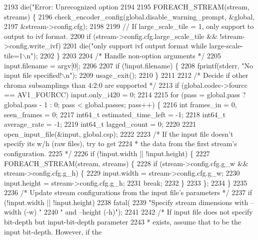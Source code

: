 \begin{DoxyCodeInclude}
{{{{{{{{{{{{{{{{{{{{{{{{{{{{{{{{{{{{{{{{{{{{{{{{{{{2193       die(\textcolor{stringliteral}{"Error: Unrecognized option %
2194 
2195   FOREACH\_STREAM(stream, streams) \{
2196     check\_encoder\_config(global.disable\_warning\_prompt, &global,
2197                          &stream->config.cfg);
2198 
2199     \textcolor{comment}{// If large\_scale\_tile = 1, only support to output to ivf format.}
2200     \textcolor{keywordflow}{if} (stream->config.cfg.large\_scale\_tile && !stream->config.write\_ivf)
2201       die(\textcolor{stringliteral}{"only support ivf output format while large-scale-tile=1\(\backslash\)n"});
2202   \}
2203 
2204   \textcolor{comment}{/* Handle non-option arguments */}
2205   input.filename = argv[0];
2206 
2207   \textcolor{keywordflow}{if} (!input.filename) \{
2208     fprintf(stderr, \textcolor{stringliteral}{"No input file specified!\(\backslash\)n"});
2209     usage\_exit();
2210   \}
2211 
2212   \textcolor{comment}{/* Decide if other chroma subsamplings than 4:2:0 are supported */}
2213   \textcolor{keywordflow}{if} (global.codec->fourcc == AV1\_FOURCC) input.only\_i420 = 0;
2214 
2215   \textcolor{keywordflow}{for} (pass = global.pass ? global.pass - 1 : 0; pass < global.passes; pass++) \{
2216     \textcolor{keywordtype}{int} frames\_in = 0, seen\_frames = 0;
2217     int64\_t estimated\_time\_left = -1;
2218     int64\_t average\_rate = -1;
2219     int64\_t lagged\_count = 0;
2220 
2221     open\_input\_file(&input, global.csp);
2222 
2223     \textcolor{comment}{/* If the input file doesn't specify its w/h (raw files), try to get}
2224 \textcolor{comment}{     * the data from the first stream's configuration.}
2225 \textcolor{comment}{     */}
2226     \textcolor{keywordflow}{if} (!input.width || !input.height) \{
2227       FOREACH\_STREAM(stream, streams) \{
2228         \textcolor{keywordflow}{if} (stream->config.cfg.g\_w && stream->config.cfg.g\_h) \{
2229           input.width = stream->config.cfg.g\_w;
2230           input.height = stream->config.cfg.g\_h;
2231           \textcolor{keywordflow}{break};
2232         \}
2233       \};
2234     \}
2235 
2236     \textcolor{comment}{/* Update stream configurations from the input file's parameters */}
2237     \textcolor{keywordflow}{if} (!input.width || !input.height)
2238       fatal(
2239           \textcolor{stringliteral}{"Specify stream dimensions with --width (-w) "}
2240           \textcolor{stringliteral}{" and --height (-h)"});
2241 
2242     \textcolor{comment}{/* If input file does not specify bit-depth but input-bit-depth parameter}
2243 \textcolor{comment}{     * exists, assume that to be the input bit-depth. However, if the}
}}}}}}}}}}}}}}}}}}}}}}}}}}}}}}}}}}}}}}}}}}}}}}}}}}}}
\end{DoxyCodeInclude}
